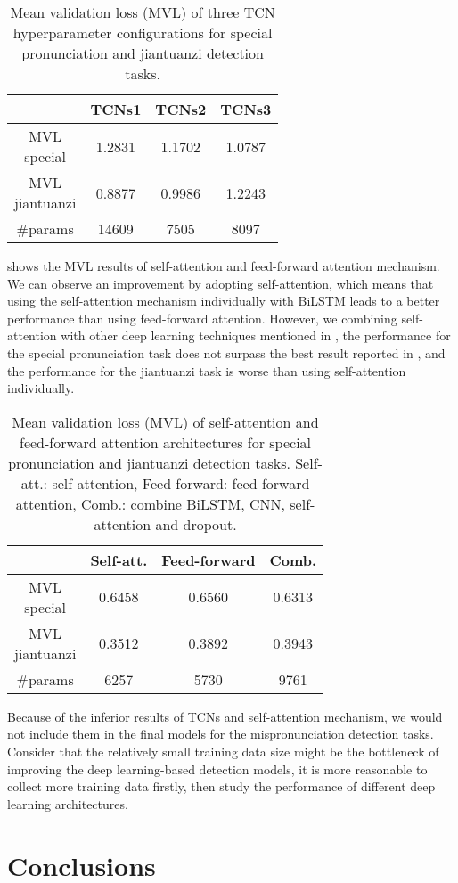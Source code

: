 \begin{table}[ht!]
\centering
\caption{Mean validation loss (MVL) of three TCN hyperparameter configurations for special pronunciation and jiantuanzi detection tasks.}
\label{tab:ch6:results_tcns_val}
\begin{tabular}{cccc}
\toprule
& TCNs1 & TCNs2 & TCNs3 \\
\midrule
\makecell{MVL\\special} & 1.2831 & 1.1702 & 1.0787 \\
\makecell{MVL\\jiantuanzi} & 0.8877 & 0.9986 & 1.2243 \\
\#params & 14609 & 7505 & 8097 \\
\bottomrule
\end{tabular}
\end{table}

 shows the MVL results of self-attention and feed-forward attention mechanism. We can observe an improvement by adopting self-attention, which means that using the self-attention mechanism individually with BiLSTM leads to a better performance than using feed-forward attention. However, we combining self-attention with other deep learning techniques mentioned in , the performance for the special pronunciation task does not surpass the best result reported in , and the performance for the jiantuanzi task is worse than using self-attention individually.

\begin{table}[ht!]
\centering
\caption{Mean validation loss (MVL) of self-attention and feed-forward attention architectures for special pronunciation and jiantuanzi detection tasks. Self-att.: self-attention, Feed-forward: feed-forward attention, Comb.: combine BiLSTM, CNN, self-attention and dropout.}
\label{tab:ch6:results_self_att_val}
\begin{tabular}{cccc}
\toprule
& Self-att. & Feed-forward & Comb. \\
\midrule
\makecell{MVL\\special} & 0.6458 & 0.6560 & 0.6313 \\
\makecell{MVL\\jiantuanzi} & 0.3512 & 0.3892 & 0.3943 \\
\#params & 6257 & 5730 & 9761 \\
\bottomrule
\end{tabular}
\end{table}

Because of the inferior results of TCNs and self-attention mechanism, we would not include them in the final models for the mispronunciation detection tasks. Consider that the relatively small training data size might be the bottleneck of improving the deep learning-based detection models, it is more reasonable to collect more training data firstly, then study the performance of different deep learning architectures.

\section{Conclusions} 
